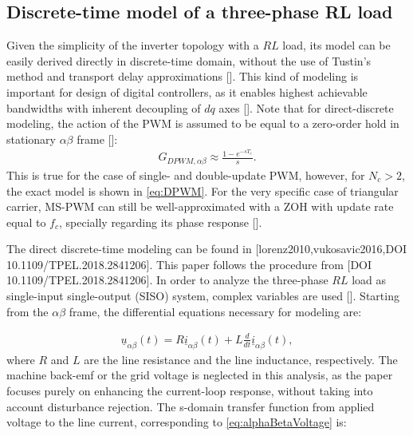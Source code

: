 \documentclass[journal]{IEEEtran}
\begin{document}
\subsection{Discrete-time model of a three-phase RL load}

Given the simplicity of the inverter topology with a $RL$ load, its model can be easily derived directly in discrete-time domain, without the use of Tustin's method and transport delay approximations []. This kind of modeling is important for design of digital controllers, as it enables highest achievable bandwidths with inherent decoupling of $dq$ axes []. 
Note that for direct-discrete modeling, the action of the PWM is assumed to be equal to a zero-order hold in stationary $\alpha \beta$ frame []:
\begin{equation}
\begin{aligned}
G_{DPWM,\alpha \beta} \approx \frac{1-e^{-sT_c}}{s}.
\label{eq:DPWMAlphaBeta} 
\end{aligned}    
\end{equation}
 This is true for the case of single- and double-update PWM, however, for $N_c>2$, the exact model is shown in \eqref{eq:DPWM}. For the very specific case of triangular carrier, MS-PWM can still be well-approximated with a ZOH with update rate equal to $f_c$, specially regarding its phase response [].

The direct discrete-time modeling can be found in [lorenz2010,vukosavic2016,DOI 10.1109/TPEL.2018.2841206]. This paper follows the procedure from [DOI 10.1109/TPEL.2018.2841206].
In order to analyze the three-phase $RL$ load as single-input single-output (SISO) system, complex variables are used []. 
Starting from the $\alpha \beta$ frame, the differential equations necessary for modeling are:

\begin{equation}
\begin{aligned}
\underline{u}_{\alpha \beta} (t) = R \underline{i}_{\alpha \beta} (t) + L \frac{d}{dt} \underline{i}_{\alpha \beta} (t),
\label{eq:alphaBetaVoltage} 
\end{aligned}    
\end{equation}
where $R$ and $L$ are the line resistance and the line inductance, respectively. The machine back-emf or the grid voltage is neglected in this analysis, as the paper focuses purely on enhancing the current-loop response, without taking into account disturbance rejection.
The s-domain transfer function from applied voltage to the line current, corresponding to \eqref{eq:alphaBetaVoltage} is:
\end{document}
